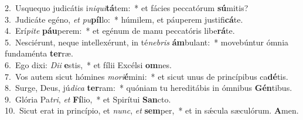 {2.~}Usquequo judicátis i\textit{ni}\textit{qui}\textbf{tá}tem:~* et fácies peccatórum \textbf{sú}mitis?\\
{3.~}Judicáte egéno, \textit{et} \textit{pu}\textbf{píl}lo:~* húmilem, et páuperem justifi\textbf{cá}te.\\
{4.~}Erí\textit{pi}\textit{te} \textbf{páu}perem:~* et egénum de manu peccatóris libe\textbf{rá}te.\\
{5.~}Nesciérunt, neque intellexérunt, in té\textit{ne}\textit{bris} \textbf{ám}bulant:~* movebúntur ómnia fundaménta \textbf{ter}ræ.\\
{6.~}Ego dixi: \textit{Di}\textit{i} \textbf{e}stis,~* et fílii Excélsi \textbf{om}nes.\\
{7.~}Vos autem sicut hómines \textit{mo}\textit{ri}\textbf{é}mini:~* et sicut unus de princípibus ca\textbf{dé}tis.\\
{8.~}Surge, Deus, jú\textit{di}\textit{ca} \textbf{ter}ram:~* quóniam tu hereditábis in ómnibus \textbf{Gén}tibus.\\
{9.~}Glória Pa\textit{tri}, \textit{et} \textbf{Fí}lio,~* et Spirítui \textbf{San}cto.\\
{10.~}Sicut erat in princípio, et \textit{nunc}, \textit{et} \textbf{sem}per,~* et in sǽcula sæculórum. \textbf{A}men.\\
